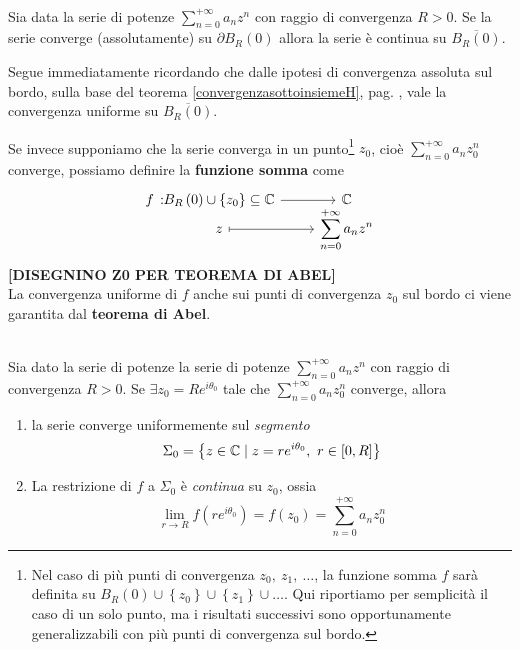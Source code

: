 \begin{corollary}~{}\\
	Sia data la serie di potenze $\displaystyle\sum_{n=0}^{+\infty}a_nz^n$ con raggio di convergenza $R>0$. Se la serie converge (assolutamente) su $\partial B_R\left(0\right)$ allora la serie è continua su $\overline{B_R\left(0\right)}$.
\end{corollary}
\begin{demonstration}
	Segue immediatamente ricordando che dalle ipotesi di convergenza assoluta sul bordo, sulla base del teorema \ref{convergenzasottoinsiemeH}, pag. \pageref{convergenzasottoinsiemeH}, vale la convergenza uniforme su $\overline{B_R\left(0\right)}$.
\end{demonstration}
Se invece supponiamo che la serie converga in un punto\footnote{Nel caso di più punti di convergenza $z_0,\ z_1,\ \ldots$, la funzione somma $f$ sarà definita su $B_R\left(0\right)\cup\left\{z_0\right\}\cup\left\{z_1\right\}\cup\ldots$. Qui riportiamo per semplicità il caso di un solo punto, ma i risultati successivi sono opportunamente generalizzabili con più punti di convergenza sul bordo.} $z_0$, cioè $\displaystyle\sum_{n=0}^{+\infty}a_nz_0^n$ converge, possiamo definire la \textbf{funzione somma} come
\begin{equation}
	\funztot{f}{B_R\left(0\right)\cup\left\{z_0\right\}\subseteq\complexset}{\complexset}{z}{\displaystyle\sum_{n=0}^{+\infty}a_nz^n}
\end{equation}
\textbf{[DISEGNINO Z0 PER TEOREMA DI ABEL]} \\ %
La convergenza uniforme di $f$ anche sui punti di convergenza $z_0$ sul bordo ci viene garantita dal \textbf{teorema di Abel}.
\begin{theorema}~{}\\
	Sia dato la serie di potenze la serie di potenze $\displaystyle\sum_{n=0}^{+\infty}a_nz^n$ con raggio di convergenza $R>0$. Se $\exists z_0=Re^{i\theta_0}$ tale che $\displaystyle\sum_{n=0}^{+\infty}a_nz_0^n$ converge, allora
	\begin{enumerate}
		\item la serie converge uniformemente sul \textit{segmento}
		\begin{equation}
			\Sigma_0=\left\{z\in\mathbb{C}\mid z=re^{i\theta_0},\ r\in\left[0,R\right]\right\}
		\end{equation}
	\item La restrizione di $f$ a $\Sigma_0$ è \textit{continua} su $z_0$, ossia
	\begin{equation}
		\lim_{r\to R}f\left(re^{i\theta_0}\right)=f\left(z_0\right)=\sum_{n=0}^{+\infty}a_nz_0^n
	\end{equation}
	\end{enumerate}
\end{theorema}